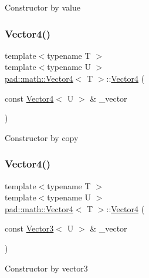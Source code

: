 Constructor by value \mbox{\label{structpad_1_1math_1_1_vector4_a75987918337a3705cae46e39f4362433}} 
\subsubsection{\texorpdfstring{Vector4()}{Vector4()}\hspace{0.1cm}{\footnotesize\ttfamily [3/5]}}
{\footnotesize\ttfamily template$<$typename T $>$ \\
template$<$typename U $>$ \\
\mbox{\hyperlink{structpad_1_1math_1_1_vector4}{pad\+::math\+::\+Vector4}}$<$ T $>$\+::\mbox{\hyperlink{structpad_1_1math_1_1_vector4}{Vector4}} (\begin{DoxyParamCaption}\item[{const \mbox{\hyperlink{structpad_1_1math_1_1_vector4}{Vector4}}$<$ U $>$ \&}]{\+\_\+vector }\end{DoxyParamCaption})}

Constructor by copy \mbox{\label{structpad_1_1math_1_1_vector4_a8eff662101e960939085ce8033f9ddae}} 
\subsubsection{\texorpdfstring{Vector4()}{Vector4()}\hspace{0.1cm}{\footnotesize\ttfamily [4/5]}}
{\footnotesize\ttfamily template$<$typename T $>$ \\
template$<$typename U $>$ \\
\mbox{\hyperlink{structpad_1_1math_1_1_vector4}{pad\+::math\+::\+Vector4}}$<$ T $>$\+::\mbox{\hyperlink{structpad_1_1math_1_1_vector4}{Vector4}} (\begin{DoxyParamCaption}\item[{const \mbox{\hyperlink{structpad_1_1math_1_1_vector3}{Vector3}}$<$ U $>$ \&}]{\+\_\+vector }\end{DoxyParamCaption})}

Constructor by vector3 \mbox{\label{structpad_1_1math_1_1_vector4_acc4699e8164a36ac16bac91357f8e7cd}} 
